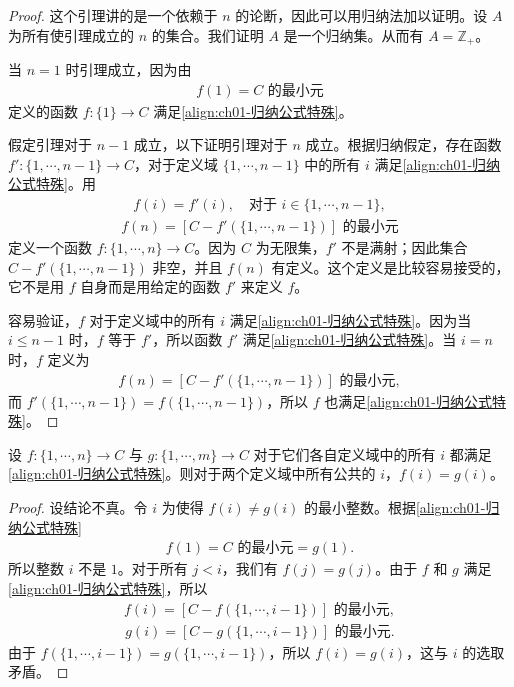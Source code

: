 \documentclass[../../main.tex]{subfiles}
\begin{document}
\begin{proof}
这个引理讲的是一个依赖于 $n$ 的论断，因此可以用归纳法加以证明。设 $A$ 为所有使引理成立的 $n$ 的集合。我们证明 $A$ 是一个归纳集。从而有 $A = \mathbb{Z}_{+}$。

当 $n = 1$ 时引理成立，因为由
\begin{align*}
f(1) = C \text{ 的最小元}
\end{align*}
定义的函数 $f: \{1\} \longrightarrow C$ 满足\eqref{align:ch01-归纳公式特殊}。

假定引理对于 $n-1$ 成立，以下证明引理对于 $n$ 成立。根据归纳假定，存在函数 $f': \{1, \cdots, n-1\} \longrightarrow C$，对于定义域 $\{1, \cdots, n-1\}$ 中的所有 $i$ 满足\eqref{align:ch01-归纳公式特殊}。用
\begin{align*}
f(i) = f'(i), \quad \text{对于 } i \in \{1, \cdots, n-1\},
\end{align*}
\begin{align*}
f(n) = [C - f'(\{1, \cdots, n-1\})] \text{ 的最小元}
\end{align*}
定义一个函数 $f: \{1, \cdots, n\} \longrightarrow C$。因为 $C$ 为无限集，$f'$ 不是满射；因此集合 $C - f'(\{1, \cdots, n-1\})$ 非空，并且 $f(n)$ 有定义。这个定义是比较容易接受的，它不是用 $f$ 自身而是用给定的函数 $f'$ 来定义 $f$。

容易验证，$f$ 对于定义域中的所有 $i$ 满足\eqref{align:ch01-归纳公式特殊}。因为当 $i \leqslant n-1$ 时，$f$ 等于 $f'$，所以函数 $f'$ 满足\eqref{align:ch01-归纳公式特殊}。当 $i = n$ 时，$f$ 定义为
\begin{align*}
f(n) = [C - f'(\{1, \cdots, n-1\})] \text{ 的最小元},
\end{align*}
而 $f'(\{1, \cdots, n-1\}) = f(\{1, \cdots, n-1\})$，所以 $f$ 也满足\eqref{align:ch01-归纳公式特殊}。
\end{proof}

\begin{lemma}[截上函数的相容性]\label{lemma:ch01-截相容}
设 $f: \{1, \cdots, n\} \longrightarrow C$ 与 $g: \{1, \cdots, m\} \longrightarrow C$ 对于它们各自定义域中的所有 $i$ 都满足\eqref{align:ch01-归纳公式特殊}。则对于两个定义域中所有公共的 $i$，$f(i) = g(i)$。
\end{lemma}

\begin{proof}
设结论不真。令 $i$ 为使得 $f(i) \neq g(i)$ 的最小整数。根据\eqref{align:ch01-归纳公式特殊}
\begin{align*}
f(1) = C \text{ 的最小元} = g(1).
\end{align*}
所以整数 $i$ 不是 $1$。对于所有 $j < i$，我们有 $f(j) = g(j)$。由于 $f$ 和 $g$ 满足\eqref{align:ch01-归纳公式特殊}，所以
\begin{align*}
f(i) = [C - f(\{1, \cdots, i-1\})] \text{ 的最小元},
\end{align*}
\begin{align*}
g(i) = [C - g(\{1, \cdots, i-1\})] \text{ 的最小元}.
\end{align*}
由于 $f(\{1, \cdots, i-1\}) = g(\{1, \cdots, i-1\})$，所以 $f(i) = g(i)$，这与 $i$ 的选取矛盾。
\end{proof}
\end{document}
